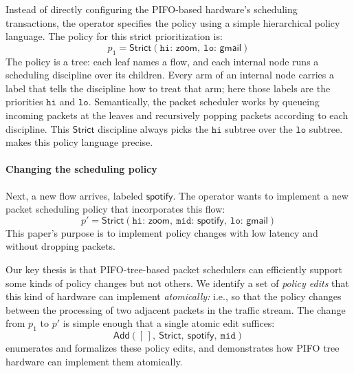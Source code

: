 \documentclass[sigplan,anonymous,review,nonacm]{acmart}
\newcommand{\Strict}{\textsf{Strict}}
\newcommand{\Add}{\textsf{Add}}
\begin{document}
Instead of directly configuring the PIFO-based hardware's scheduling transactions, the operator specifies the policy using a simple hierarchical policy language.
The policy for this strict prioritization is:
%
\[ p_1 = \Strict(\mathtt{hi}{:}\,\textsf{zoom},\ \mathtt{lo}{:}\,\textsf{gmail}) \]
%
The policy is a tree: each leaf names a flow, and each internal node runs a scheduling discipline over its children.
Every arm of an internal node carries a label that tells the discipline how to treat that arm; here those labels are the priorities $\mathtt{hi}$ and $\mathtt{lo}$.
Semantically, the packet scheduler works by queueing incoming packets at the leaves and recursively popping packets according to each discipline.
This $\Strict$ discipline always picks the $\mathtt{hi}$ subtree over the $\mathtt{lo}$ subtree.
 makes this policy language precise.

\paragraph{Changing the scheduling policy}

Next, a new flow arrives, labeled $\mathsf{spotify}$.
The operator wants to implement a new packet scheduling policy that incorporates this flow:
%
\[
p' = \Strict(\mathtt{hi}{:}\,\textsf{zoom},\ \mathtt{mid}{:}\,\textsf{spotify},\ \mathtt{lo}{:}\,\textsf{gmail})
\]
%
This paper's purpose is to implement policy changes with low latency and without dropping packets.

Our key thesis is that PIFO-tree-based packet schedulers can efficiently support some kinds of policy changes but not others.
We identify a set of \emph{policy edits} that this kind of hardware can implement \emph{atomically:}
i.e., so that the policy changes between the processing of two adjacent packets in the traffic stream.
The change from \(p_1\) to \(p'\) is simple enough that a single atomic edit suffices:
%
\[
\Add([\,],\ \Strict,\ \textsf{spotify},\ \mathtt{mid})
\]
%
 enumerates and formalizes these policy edits,
and  demonstrates how PIFO tree hardware can implement them atomically.
\end{document}
